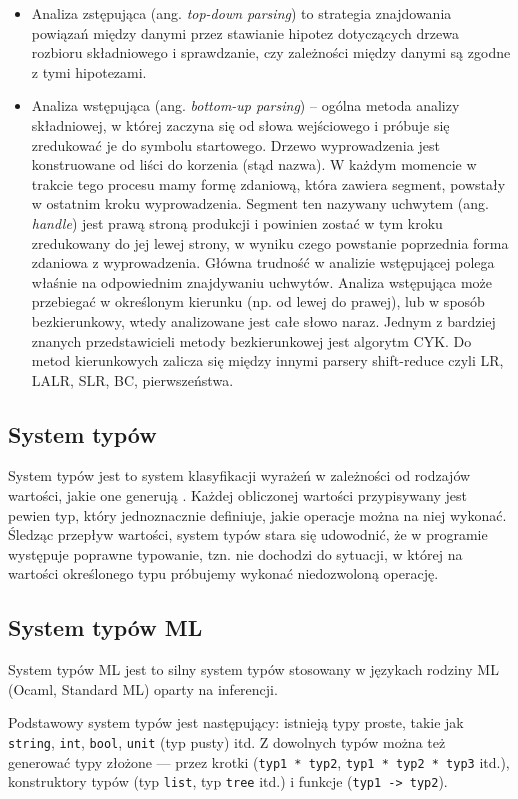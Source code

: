 \documentclass{article}
\begin{document}
\begin{itemize}
  \item Analiza zstępująca (ang. \emph{top-down parsing}) to strategia znajdowania powiązań między danymi przez stawianie hipotez dotyczących drzewa rozbioru składniowego i sprawdzanie, czy zależności między danymi są zgodne z tymi hipotezami.
  \item Analiza wstępująca (ang. \emph{bottom-up parsing}) – ogólna metoda analizy składniowej, w której zaczyna się od słowa wejściowego i próbuje się zredukować je do symbolu startowego. Drzewo wyprowadzenia jest konstruowane od liści do korzenia (stąd nazwa). W każdym momencie w trakcie tego procesu mamy formę zdaniową, która zawiera segment, powstały w ostatnim kroku wyprowadzenia. Segment ten nazywany uchwytem (ang. \emph{handle}) jest prawą stroną produkcji i powinien zostać w tym kroku zredukowany do jej lewej strony, w wyniku czego powstanie poprzednia forma zdaniowa z wyprowadzenia. Główna trudność w analizie wstępującej polega właśnie na odpowiednim znajdywaniu uchwytów.
        Analiza wstępująca może przebiegać w określonym kierunku (np. od lewej do prawej), lub w sposób bezkierunkowy, wtedy analizowane jest całe słowo naraz. Jednym z bardziej znanych przedstawicieli metody bezkierunkowej jest algorytm CYK. Do metod kierunkowych zalicza się między innymi parsery shift-reduce czyli LR, LALR, SLR, BC, pierwszeństwa.
\end{itemize}



\subsection{System typów}
System typów jest to system klasyfikacji wyrażeń w zależności od rodzajów wartości, jakie one generują \cite{Pierce__Benjamin__C__2002}. Każdej obliczonej wartości przypisywany jest pewien typ, który jednoznacznie definiuje, jakie operacje można na niej wykonać. Śledząc przepływ wartości, system typów stara się udowodnić, że w programie występuje poprawne typowanie, tzn. nie dochodzi do sytuacji, w której na wartości określonego typu próbujemy wykonać niedozwoloną operację.
\subsection{System typów ML} System typów ML jest to silny system typów stosowany w językach rodziny ML (Ocaml, Standard ML) oparty na inferencji.

Podstawowy system typów jest następujący: istnieją typy proste, takie jak \lstinline$string$, \lstinline$int$, \lstinline$bool$, \lstinline$unit$ (typ pusty) itd. Z dowolnych typów można też generować typy złożone –-- przez krotki (\lstinline$typ1 * typ2$, \lstinline$typ1 * typ2 * typ3$ itd.), konstruktory typów (typ \lstinline$list$, typ \lstinline$tree$ itd.) i funkcje (\lstinline$typ1 -> typ2$).
\end{document}
